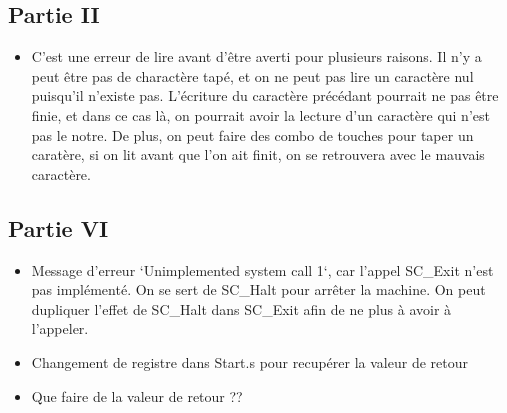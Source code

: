 \documentclass{article}
\begin{document}
\subsection{Partie II}
\begin{itemize}
    \item C'est une erreur de lire avant d'être averti pour plusieurs raisons. Il n'y a peut être pas de charactère tapé, et on ne peut pas lire un caractère nul puisqu'il n'existe pas.
    L'écriture du caractère précédant pourrait ne pas être finie, et dans ce cas là, on pourrait avoir la lecture d'un caractère qui n'est pas le notre.
    De plus, on peut faire des combo de touches pour taper un caratère, si on lit avant que l'on ait finit, on se retrouvera avec le mauvais caractère.

    
\end{itemize}


\subsection{Partie VI}
\begin{itemize}
    \item Message d'erreur `Unimplemented system call 1`, car l'appel SC\_Exit n'est pas implémenté. On se sert de SC\_Halt pour arrêter la machine.
    On peut dupliquer l'effet de SC\_Halt dans SC\_Exit afin de ne plus à avoir à l'appeler.
    \item Changement de registre dans Start.s pour recupérer la valeur de retour
    \item Que faire de la valeur de retour ??
\end{itemize}
\end{document}
